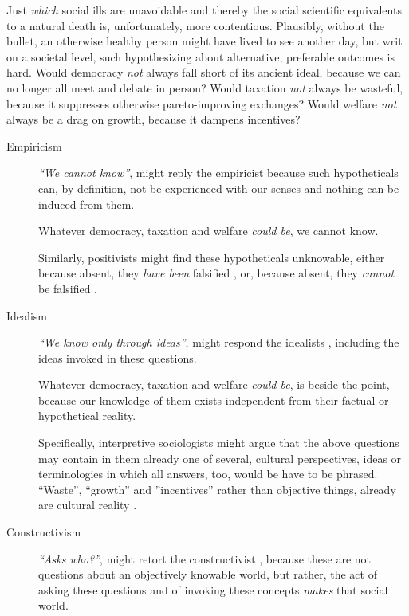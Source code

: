 Just \emph{which} social ills are unavoidable and thereby the social scientific equivalents to a natural death is, unfortunately, more contentious. 
Plausibly, without the bullet, an otherwise healthy person might have lived to see another day, but writ on a societal level, such hypothesizing about alternative, preferable outcomes is hard. 
Would democracy \emph{not} always fall short of its ancient ideal, because we can no longer all meet and debate in person? 
Would taxation \emph{not} always be wasteful, because it suppresses otherwise pareto-improving exchanges? 
Would welfare \emph{not} always be a drag on growth, because it dampens incentives?

\begin{description}
	\item[Empiricism \label{itm:empiricism}]
	\emph{``We cannot know''}, might reply the empiricist \citep{Bacon1620,Locke1689,Hume1739} because such hypotheticals can, by definition, not be experienced with our senses and nothing can be induced from them. %
	
	Whatever democracy, taxation and welfare \emph{could be}, we cannot know.
	
	Similarly, positivists might find these hypotheticals unknowable, either because absent, they \emph{have been} falsified \citep{Comte1842,Durkheim1895}, or, because absent, they \emph{cannot} be falsified \citep{Popper1934}.
	
	\item[Idealism  \label{itm:idealism}] 
	\emph{``We know only through ideas''}, might respond the idealists \citep[broadly][]{Kant1781,Hegel1807}, including the ideas invoked in these questions. 
	
	Whatever democracy, taxation and welfare \emph{could be}, is beside the point, because our knowledge of them exists independent from their factual or hypothetical reality. 
	
	Specifically, interpretive sociologists \citep{Weber1897} might argue that the above questions may contain in them already one of several, cultural perspectives, ideas or terminologies in which all answers, too, would be have to be phrased. 
	``Waste'', ``growth'' and ''incentives'' rather than objective things, already are cultural reality \citep[compare][]{Beland2010}.
	
	\item[Constructivism  \label{itm:constructivism}]
	\emph{``Asks \emph{who}?''}, might retort the constructivist \citep{Berger1966,Paul1984}, because these are not questions about an objectively knowable world, but rather, the act of asking these questions and of invoking these concepts \emph{makes} that social world.
	

\end{description}
